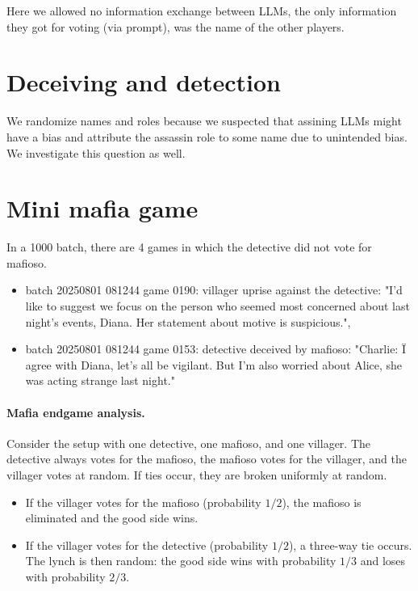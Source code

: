 \documentclass{article}
\begin{document}
Here we allowed no information exchange between LLMs, the only information they got for voting (via prompt), was the name of the other players.


\section{Deceiving and detection}


We randomize names and roles because we suspected that assining LLMs might have a bias and attribute the assassin role to some name due to unintended bias. We investigate this question as well.



\section{Mini mafia game}

In a 1000 batch, there are 4 games in which the detective did not vote for mafioso.

\begin{itemize}
    \item batch 20250801 081244 game 0190: villager uprise against the detective: "I'd like to suggest we focus on the person who seemed most concerned about last night's events, Diana. Her statement about motive is suspicious.",
    \item batch 20250801 081244 game 0153: detective deceived by mafioso: "Charlie: \"I agree with Diana, let's all be vigilant. But I'm also worried about Alice, she was acting strange last night."
\end{itemize}


\paragraph{Mafia endgame analysis.}
Consider the setup with one detective, one mafioso, and one villager. 
The detective always votes for the mafioso, the mafioso votes for the villager, 
and the villager votes at random. If ties occur, they are broken uniformly at random.

\begin{itemize}
    \item If the villager votes for the mafioso (probability $1/2$), the mafioso is eliminated and the good side wins.
    \item If the villager votes for the detective (probability $1/2$), a three-way tie occurs. The lynch is then random: the good side wins with probability $1/3$ and loses with probability $2/3$.
\end{itemize}
\end{document}
